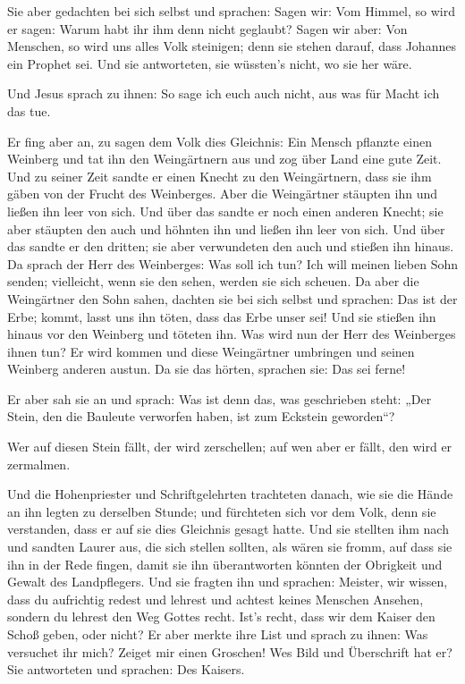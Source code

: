  Sie aber gedachten bei sich selbst und sprachen: Sagen
wir: Vom Himmel, so wird er sagen: Warum habt ihr ihm denn nicht
geglaubt?  Sagen wir aber: Von Menschen, so wird uns alles
Volk steinigen; denn sie stehen darauf, dass Johannes ein Prophet sei.
 Und sie antworteten, sie wüssten's nicht, wo sie her
wäre.

 Und Jesus sprach zu ihnen: So sage ich euch auch nicht,
aus was für Macht ich das tue.

 Er fing aber an, zu sagen dem Volk dies Gleichnis: Ein
Mensch pflanzte einen Weinberg und tat ihn den Weingärtnern aus und zog
über Land eine gute Zeit.  Und zu seiner Zeit sandte er
einen Knecht zu den Weingärtnern, dass sie ihm gäben von der Frucht des
Weinberges. Aber die Weingärtner stäupten ihn und ließen ihn leer von
sich.  Und über das sandte er noch einen anderen Knecht;
sie aber stäupten den auch und höhnten ihn und ließen ihn leer von sich.
 Und über das sandte er den dritten; sie aber verwundeten
den auch und stießen ihn hinaus.  Da sprach der Herr des
Weinberges: Was soll ich tun? Ich will meinen lieben Sohn senden;
vielleicht, wenn sie den sehen, werden sie sich scheuen. 
Da aber die Weingärtner den Sohn sahen, dachten sie bei sich selbst und
sprachen: Das ist der Erbe; kommt, lasst uns ihn töten, dass das Erbe
unser sei!  Und sie stießen ihn hinaus vor den Weinberg
und töteten ihn. Was wird nun der Herr des Weinberges ihnen tun?
 Er wird kommen und diese Weingärtner umbringen und
seinen Weinberg anderen austun. Da sie das hörten, sprachen sie: Das sei
ferne!

 Er aber sah sie an und sprach: Was ist denn das, was
geschrieben steht: „Der Stein, den die Bauleute verworfen haben, ist zum
Eckstein geworden``?

 Wer auf diesen Stein fällt, der wird zerschellen; auf
wen aber er fällt, den wird er zermalmen.

 Und die Hohenpriester und Schriftgelehrten trachteten
danach, wie sie die Hände an ihn legten zu derselben Stunde; und
fürchteten sich vor dem Volk, denn sie verstanden, dass er auf sie dies
Gleichnis gesagt hatte.  Und sie stellten ihm nach und
sandten Laurer aus, die sich stellen sollten, als wären sie fromm, auf
dass sie ihn in der Rede fingen, damit sie ihn überantworten könnten der
Obrigkeit und Gewalt des Landpflegers.  Und sie fragten
ihn und sprachen: Meister, wir wissen, dass du aufrichtig redest und
lehrest und achtest keines Menschen Ansehen, sondern du lehrest den Weg
Gottes recht.  Ist's recht, dass wir dem Kaiser den Schoß
geben, oder nicht?  Er aber merkte ihre List und sprach
zu ihnen: Was versuchet ihr mich?  Zeiget mir einen
Groschen! Wes Bild und Überschrift hat er? Sie antworteten und sprachen:
Des Kaisers.

